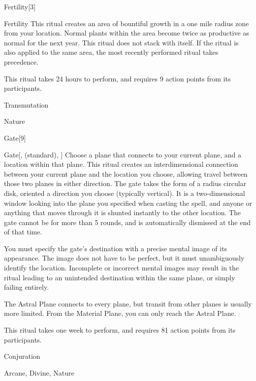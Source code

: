 \begin{spellsection}{Fertility}[3]


\begin{ability}{Fertility}
This ritual creates an area of bountiful growth in a one mile radius zone from your location.
Normal plants within the area become twice as productive as normal for the next year.
This ritual does not stack with itself.
If the  ritual is also applied to the same area, the most recently performed ritual takes precedence.

This ritual takes 24 hours to perform, and requires 9 action points from its participants.
\end{ability}




 Transmutation

 Nature
\end{spellsection}


\begin{spellsection}{Gate}[9]


\begin{ability}{Gate}[,  (standard), ]
Choose a plane that connects to your current plane, and a location within that plane.
This ritual creates an interdimensional connection between your current plane and the location you choose, allowing travel between those two planes in either direction.
The gate takes the form of a \areasmall radius circular disk, oriented a direction you choose (typically vertical).
It is a two-dimensional window looking into the plane you specified when casting the spell, and anyone or anything that moves through it is shunted instantly to the other location.
The gate cannot be  for more than 5 rounds, and is automatically dismissed at the end of that time.

You must specify the gate's destination with a precise mental image of its appearance.
The image does not have to be perfect, but it must unambiguously identify the location.
Incomplete or incorrect mental images may result in the ritual leading to an unintended destination within the same plane, or simply failing entirely.

The Astral Plane connects to every plane, but transit from other planes is usually more limited.
From the Material Plane, you can only reach the Astral Plane.

This ritual takes one week to perform, and requires 81 action points from its participants.
\end{ability}




 Conjuration

 Arcane, Divine, Nature
\end{spellsection}


